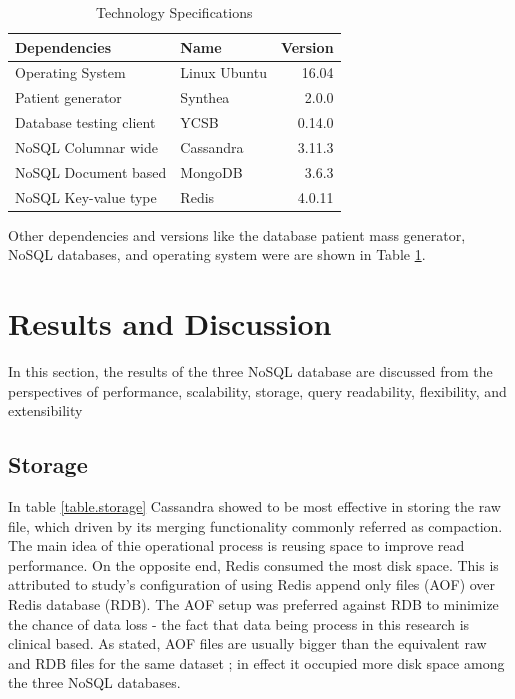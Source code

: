 \documentclass[5p]{elsarticle}
\begin{document}
\begin{table}[h]
    \centering															
    \caption{Technology Specifications}
     \label{table.technology.versions}
     \begin{tabular}{llr}
        \toprule
        Dependencies & Name & Version\\
        \hline
        Operating System        & Linux Ubuntu & 16.04\\
        Patient generator       & Synthea      & 2.0.0\\
        Database testing client & YCSB         & 0.14.0\\
        NoSQL Columnar wide     & Cassandra    & 3.11.3\\
        NoSQL Document based    & MongoDB      & 3.6.3\\
        NoSQL Key-value type    & Redis        & 4.0.11\\
        \hline
    \end{tabular}															
\end{table}


Other dependencies and versions like the database patient mass generator, NoSQL databases, and operating system were are shown in Table \ref{table.technology.versions}. 

	
\section{Results and Discussion} In this section, the results of the three NoSQL database are discussed from the perspectives of performance, scalability, storage, query readability, flexibility, and extensibility

\subsection{Storage} 

In table \ref{table.storage} Cassandra showed to be most effective in storing the raw file, which driven by its merging functionality commonly referred as compaction. 
The main idea of thie operational process is reusing space to improve read performance. 
On the opposite end, Redis consumed the most disk space. This is attributed to study's configuration of using Redis append only files (AOF) over Redis database (RDB). 
The AOF setup was preferred against RDB to minimize the chance of data loss - the fact that data being process in this research is clinical based. 
As stated, AOF files are usually bigger than the equivalent raw and RDB files for the same dataset \cite{RedisLabs2018}; in effect it occupied more disk space among the three NoSQL databases.
\end{document}
